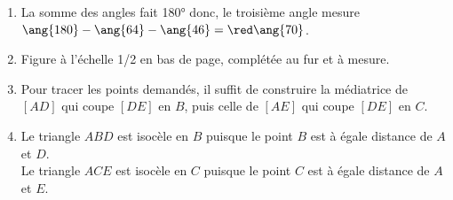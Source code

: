 \begin{corrige}
   \begin{enumerate}
      \item La somme des angles fait \ang{180} donc, le troisième angle mesure $\ang{180}-\ang{64}-\ang{46} =\red\ang{70}$.
      \item Figure à l'échelle 1/2 en bas de page, complétée au fur et à mesure.
      \item Pour tracer les points demandés, il suffit de construire la médiatrice de $[AD]$ qui coupe $[DE]$ en $B$, puis celle de $[AE]$ qui coupe $[DE]$ en $C$.
      \item {\red Le triangle $ABD$ est isocèle en $B$} puisque le point $B$ est à égale distance de $A$ et $D$. \\
         {\red Le triangle $ACE$ est isocèle en $C$} puisque le point $C$ est à égale distance de $A$ et $E$.
   


\end{enumerate}
\end{corrige}
